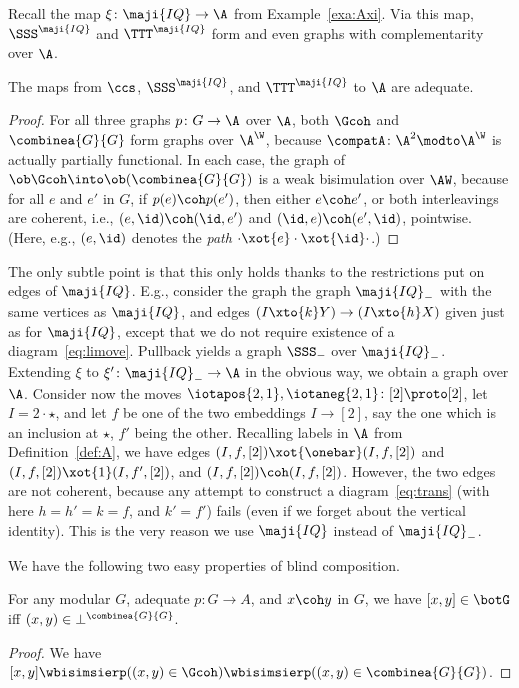 \documentclass{LMCS}
\renewcommand{\QFI}{\maji{IQ}}
\renewcommand{\LLL}{\QFI}
\renewcommand{\SSSL}{\SSS^{\LLL}}
\renewcommand{\TTTL}{\TTT^{\LLL}}
\theoremstyle{plain}\newtheorem{satz}[thm]{Satz}
\begin{document}
Recall the map $\xi \colon \LLL \to \A$ from Example~\ref{exa:Axi}.
Via this map, $\SSSL$ and $\TTTL$ form \ltss{} and even graphs with
complementarity over $\A$.
\begin{prop}
  The maps from $\ccs$, $\SSSL$, and $\TTTL$ to $\A$ are adequate.
\end{prop}
\begin{proof}
  For all three graphs $p \colon G \to \A$ over $\A$, both $\Gcoh$ and
  $\combinea{G}{G}$ form graphs over $\A^\W$, because $\compatA \colon
  \A^2 \modto \A^\W$ is actually partially functional.  In each case,
  the graph of $\ob \Gcoh \into \ob(\combinea{G}{G})$ is a weak
  bisimulation over $\AW$, because for all $e$ and $e'$ in $G$, if
  $p(e) \coh p(e')$, then either $e \coh e'$, or both interleavings
  are coherent, i.e., $(e,\id) \coh (\id,e')$ and $(\id,e) \coh (e',
  \id)$, pointwise. (Here, e.g., $(e,\id)$ denotes the \emph{path}
  $\cdot \xot{e} \cdot \xot{\id} \cdot$.)
\end{proof}
The only subtle point is that this only holds thanks to the
restrictions put on edges of $\LLL$. E.g., consider the graph the
graph $\LLL_{-}$ with the same vertices as $\LLL$, and edges $(I
\xto{k} Y) \to (I \xto{h} X)$ given just as for $\LLL$, except that we
do not require existence of a diagram~\eqref{eq:limove}.  Pullback
yields a graph $\SSS_{-}$ over $\LLL_{-}$.  Extending $\xi$ to $\xi'
\colon \LLL_{-} \to \A$ in the obvious way, we obtain a graph over
$\A$.  Consider now the moves $\iotapos{2,1}, \iotaneg{2,1} \colon [2]
\proto [2]$, let $I = 2 \cdot \star$, and let $f$ be one of the two
embeddings $I \to [2]$, say the one which is an inclusion at $\star$,
$f'$ being the other.  Recalling labels in $\A$ from
Definition~\ref{def:A}, we have edges $(I, f,[2]) \xot{\onebar} (I,
f,[2])$ and $(I, f,[2]) \xot{1} (I, f',[2])$, and $(I, f,[2]) \coh (I,
f,[2])$. However, the two edges are not coherent, because any attempt
to construct a diagram~\eqref{eq:trans} (with here $h = h' = k = f$,
and $k' = f'$) fails (even if we forget about the vertical
identity). This is the very reason we use $\LLL$ instead of
$\LLL_{-}$.

We have the following two easy properties of blind composition.
\begin{prop}\label{prop:combine:adeq}
  For any modular $G$, adequate $p \colon G \to A$, and $x \coh y$ in $G$, we have 
  $[x,y] \in \botG$ iff $(x,y) \in \bot^{\combinea{G}{G}}$.
\end{prop}
\begin{proof}
We have  $[x,y] \wbisimsierp ((x,y) \in \Gcoh) \wbisimsierp ((x,y) \in \combinea{G}{G})$.
\end{proof}
\end{document}
